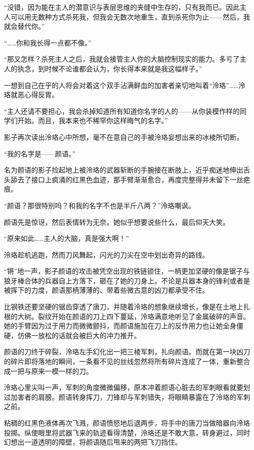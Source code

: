 \documentclass[UTF8, scheme = chinese, openany]{ctexbook}
\begin{document}
“没错，因为能在主人的潜意识与表层思维的夹缝中生存的，只有我而已。因此主人可以用无数种方式杀死我，但我会无数次地重生，直到杀死你为止——然后，我就会替代你。”

“……你和我长得一点都不像。”

“那又怎样？杀死主人之后，我就会接管主人你的大脑控制现实的能力。多亏了主人的执念，到时候不论谁都会认为，你长得本来就是我这幅样子。”

一想到自己在乎的人将会对着这个双手沾满鲜血的加害者亲切地叫着“泠珞”……泠珞就恶心得反胃。

“主人还请不要担心，我会杀掉知道所有知道你名字的人的——从你装模作样的同学们开始。而且，我本来也不稀罕你这样晦气的名字。”

影子再次读出泠珞心中所想，毫不在意自己的手被泠珞妄想出来的冰棱所切断。

“我的名字是——颜语。”

名为颜语的影子捡起地上被泠珞的武器斩断的手腕接在断肢上，近乎痴迷地伸出舌头舔去了接口上疯涌的红黑色血迹，那手臂渐渐愈合，再度完整得并未留下一丝疤痕。

“颜语？那很特别吗？和我的名字不也是半斤八两？”泠珞嘲讽。

颜语先是惊讶，然后表情转为无奈。她似乎想要说些什么，最后仰天大笑。

“原来如此……主人的大脑，真是强大啊！”

泠珞趁机逃跑，然而刀风舞起，闪光的刀尖在空中划出奇异的路线。

“锵”地一声，影子颜语的攻击被凭空出现的铁链锁住，一柄更加坚硬的像是锯子与狼牙棒合体的兵器自上方落下，砸在了她的刀身上。不论是兵器本身的锋利或者是被挥下的力度，颜语那柄薄薄的、带着些微古意的凶刀都承受不住。

比钢铁还要坚硬的锯齿穿透了唐刀，并随着泠珞的想象继续增长，像是在土地上扎根的大树。裂纹开始在颜语的刀上四下蔓延，泠珞满意地听见了金属破碎的声音。她的手臂因为过于用力而微微颤抖，而颜语施加在刀上的反作用力也让她全身僵硬，仿佛一放松的话就会被巨大的冲力推开。

颜语的刀终于碎裂，泠珞左手幻化出一把三棱军刺，扎向颜语。而就在第一块凶刀的碎片即将落地的瞬间，一条看不见的丝线忽然将所有碎片连成了一体，重新整合成一把与原来一模一样的刀。

泠珞心里尖叫一声，军刺的角度微微偏移，原本冲着颜语心脏去的军刺眼看就要划过加害者的肩膀。颜语转身挥刀，刀锋却与军刺错失，将眼睛暴露在了泠珞的军刺之前。

粘稠的红黑色液体再次飞溅，颜语愤怒地后退两步，将手中的唐刀当做暗器向泠珞投掷。纵使眼里将武器飞来的轨迹看得清楚，泠珞还是不敢大意，转身避过，同时幻想出一道透明的障壁，将颜语随后甩来的两把飞刀挡住。
\end{document}
